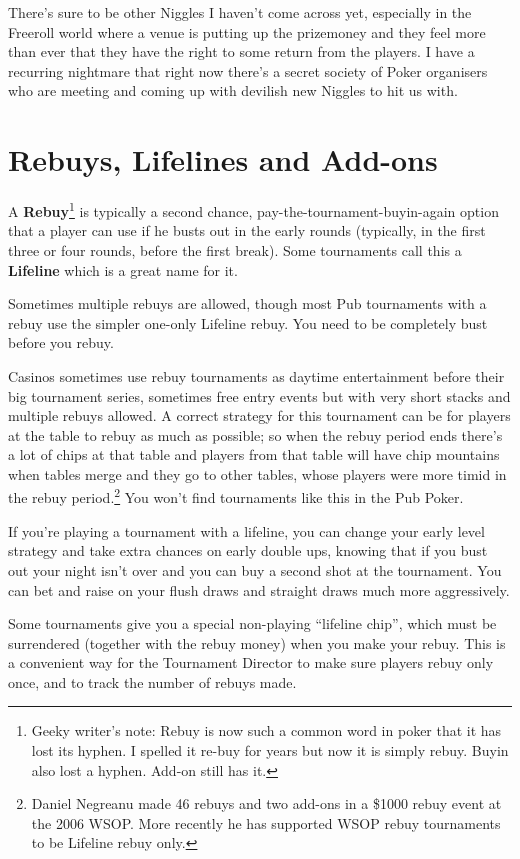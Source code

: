 There's sure to be other Niggles I haven't come across yet,
especially in the Freeroll world where a venue is putting up the
prizemoney and they feel more than ever that they have the right
to some return from the players. I have a recurring
nightmare that right now there's a secret society of Poker organisers
who are meeting and coming up with devilish new Niggles to hit us with.

\section{Rebuys, Lifelines and Add-ons}

A \textbf{Rebuy}\footnote{Geeky writer's note: Rebuy is now such a
  common word in poker that it has lost its hyphen. I spelled it
  re-buy for years but now it is simply rebuy. Buyin also lost a
  hyphen. Add-on still has it.}
is typically a second chance, pay-the-tournament-buyin-again
option that a player can use if he busts out in the early rounds
(typically, in the first three or four rounds, before the first
break). Some tournaments call this a \textbf{Lifeline} which is a
great name for it.

Sometimes multiple rebuys are allowed, though most Pub tournaments
with a rebuy use the simpler one-only Lifeline rebuy. You
need to be completely bust before you rebuy.

Casinos sometimes use rebuy tournaments as daytime entertainment
before their big tournament series, sometimes free entry events
but with very short stacks and multiple rebuys allowed. A correct
strategy for this tournament can be for players at the table
to rebuy as much as possible; so when the rebuy period ends there's
a lot of chips at that table and players from that table will
have chip mountains when tables merge and they go to
other tables, whose players were more timid in the rebuy
period.\footnote{Daniel Negreanu made 46 rebuys and two add-ons
  in a \$1000 rebuy event at the 2006 WSOP. More recently he has
  supported WSOP rebuy tournaments to be Lifeline rebuy only.} You
won't find tournaments like this in the Pub Poker.

If you're playing a tournament with a lifeline, you can change
your early level strategy and take extra chances on early
double ups, knowing that if you bust out your night isn't over and
you can buy a second shot at the tournament. You can bet and raise
on your flush draws and straight draws much more aggressively.

Some tournaments give you a special non-playing ``lifeline chip'',
which must be surrendered (together with the rebuy money) when you
make your rebuy. This is a convenient way for the Tournament
Director to make sure players rebuy only once, and to track the number
of rebuys made.

